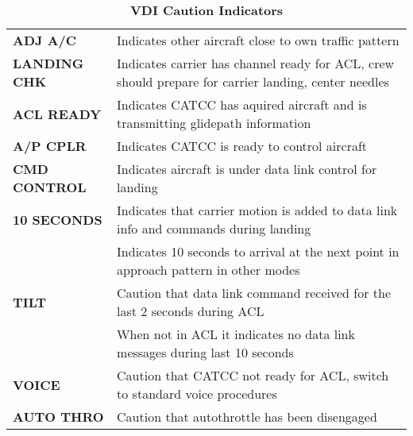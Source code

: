 \documentclass[fontMetropolis]{TechCheck}
\begin{document}

	\begin{table}[h]
		\caption{\textbf{VDI Caution Indicators}}
		\label{tab:vdicautionind}
		\begin{tabular}{p{2.8cm} | p{9cm}}
			\toprule
			\blue{Light} & \blue{Description} \\
			\midrule
			\textbf{ADJ A/C} & Indicates other aircraft close to own traffic pattern \\
			\midrule
			\textbf{LANDING CHK} & Indicates carrier has channel ready for ACL, crew should prepare for carrier landing, center needles \\
			\midrule
			\textbf{ACL READY} & Indicates CATCC has aquired aircraft and is transmitting glidepath information \\
			\midrule
			\textbf{A/P CPLR} & Indicates CATCC is ready to control aircraft \\
			\midrule
			\textbf{CMD CONTROL} & Indicates aircraft is under data link control for landing \\
			\midrule
			\textbf{10 SECONDS} & Indicates that carrier motion is added to data link info and commands during landing \\
			& Indicates 10 seconds to arrival at the next point in approach pattern in other modes \\
			\midrule
			\textbf{TILT} & Caution that data link command received for the last 2 seconds during ACL \\
			& When not in ACL it indicates no data link messages during last 10 seconds \\
			\midrule
			\textbf{VOICE} & Caution that CATCC not ready for ACL, switch to standard voice procedures \\
			\midrule
			\textbf{AUTO THRO} & Caution that autothrottle has been disengaged \\

\end{tabular}
\end{table}
\end{document}

